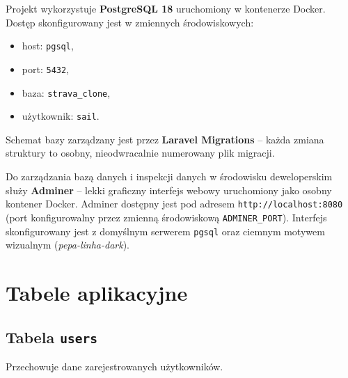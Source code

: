 \documentclass[12pt,a4paper]{report}
\begin{document}
Projekt wykorzystuje \textbf{PostgreSQL 18} uruchomiony w kontenerze Docker. Dostęp skonfigurowany jest w zmiennych środowiskowych:
\begin{itemize}[noitemsep]
    \item host: \texttt{pgsql},
    \item port: \texttt{5432},
    \item baza: \texttt{strava\_clone},
    \item użytkownik: \texttt{sail}.
\end{itemize}

Schemat bazy zarządzany jest przez \textbf{Laravel Migrations} -- każda zmiana struktury to osobny, nieodwracalnie numerowany plik migracji.

Do zarządzania bazą danych i inspekcji danych w środowisku deweloperskim służy \textbf{Adminer} -- lekki graficzny interfejs webowy uruchomiony jako osobny kontener Docker. Adminer dostępny jest pod adresem \texttt{http://localhost:8080} (port konfigurowalny przez zmienną środowiskową \texttt{ADMINER\_PORT}). Interfejs skonfigurowany jest z domyślnym serwerem \texttt{pgsql} oraz ciemnym motywem wizualnym (\textit{pepa-linha-dark}).

\section{Tabele aplikacyjne}

\subsection{Tabela \texttt{users}}

Przechowuje dane zarejestrowanych użytkowników.
\end{document}
